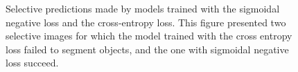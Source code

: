 \begin{figure}
\begin{minipage}{\columnwidth}
  \end{minipage}
\caption{
Selective predictions made by models trained with the sigmoidal negative loss and the cross-entropy loss.
This figure presented two selective images for which the model trained with the cross entropy loss failed to segment objects, and the one with sigmoidal negative loss succeed.
}
\label{fig:pusegment}
\end{figure}
